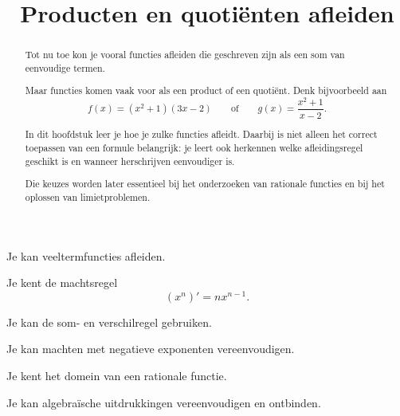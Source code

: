\documentclass{ximera}
\begin{document}










\title{Producten en quotiënten afleiden}

\begin{abstract}
Tot nu toe kon je vooral functies afleiden die geschreven zijn als een som
van eenvoudige termen.

Maar functies komen vaak voor als een product of een quotiënt.
Denk bijvoorbeeld aan
\[
f(x)=(x^2+1)(3x-2)
\qquad\text{of}\qquad
g(x)=\frac{x^2+1}{x-2}.
\]

In dit hoofdstuk leer je hoe je zulke functies afleidt.
Daarbij is niet alleen het correct toepassen van een formule belangrijk:
je leert ook herkennen welke afleidingsregel geschikt is en wanneer
herschrijven eenvoudiger is.

Die keuzes worden later essentieel bij het onderzoeken van rationale
functies en bij het oplossen van limietproblemen.
\end{abstract}

\maketitle



\begin{voorkennis}
  \item Je kan veeltermfuncties afleiden.
  \item Je kent de machtsregel
        \[
        (x^n)'=nx^{n-1}.
        \]
  \item Je kan de som- en verschilregel gebruiken.
  \item Je kan machten met negatieve exponenten vereenvoudigen.
  \item Je kent het domein van een rationale functie.
  \item Je kan algebraïsche uitdrukkingen vereenvoudigen en ontbinden.
\end{voorkennis}
\end{document}
